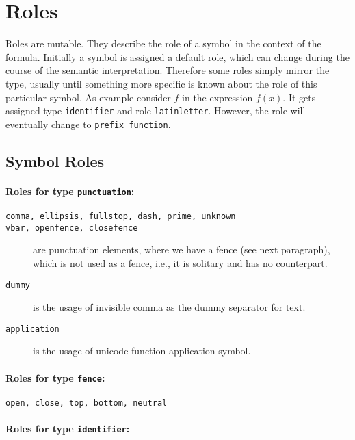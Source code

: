 \documentclass{article}
\begin{document}
\section{Roles}
\label{sec:roles}

Roles are mutable. They describe the role of a symbol in the context of the
formula. Initially a symbol is assigned a default role, which can change during
the course of the semantic interpretation.  Therefore some roles simply mirror
the type, usually until something more specific is known about the role of this
particular symbol. As example consider $f$ in the expression $f(x)$. It gets
assigned type \texttt{identifier} and role \texttt{latinletter}. However, the
role will eventually change to \texttt{prefix function}.

\subsection{Symbol Roles}
\label{sec:symbol-roles}

\paragraph{Roles for type \texttt{punctuation}:}

\begin{description}
\item[\texttt{comma, ellipsis, fullstop, dash, prime, unknown}]
\item[\texttt{vbar, openfence, closefence}] are punctuation elements, where we have a
fence (see next paragraph), which is not used as a fence, i.e., it is solitary
and has no counterpart.
\item[\texttt{dummy}] is the usage of invisible comma as the dummy separator for text.
\item[\texttt{application}] is the usage of unicode function application symbol.
\end{description}



\paragraph{Roles for type \texttt{fence}:}

\texttt{open, close, top, bottom, neutral}


\paragraph{Roles for type \texttt{identifier}:}
\end{document}
